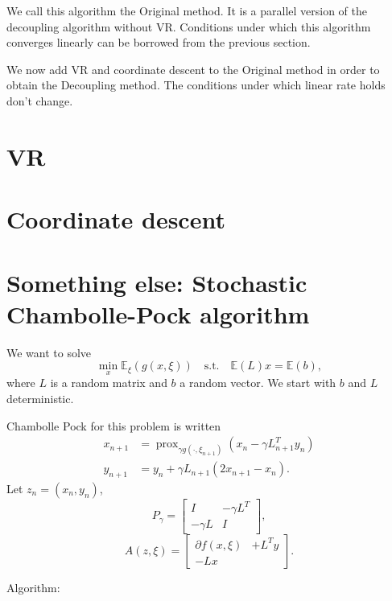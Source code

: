 \documentclass{article}
\DeclareMathOperator{\prox}{prox}
\newcommand{\bE}{{\mathbb E}}
\theoremstyle{definition}
\begin{document}
We call this algorithm the Original method. It is a parallel version of the decoupling algorithm without VR.
Conditions under which this algorithm converges linearly can be borrowed from the previous section.

We now add VR and coordinate descent to the Original method in order to obtain the Decoupling method. The conditions under which linear rate holds don't change.

\section{VR}

\section{Coordinate descent}


\section{Something else: Stochastic Chambolle-Pock algorithm}

We want to solve 
\begin{equation}
    \min_x \bE_\xi(g(x,\xi)) \quad\text{s.t.}\quad \bE(L)x = \bE(b),
\end{equation}
where $L$ is a random matrix and $b$ a random vector. We start with $b$ and $L$ deterministic. 

Chambolle Pock for this problem is written
\begin{align}
    x_{n+1} &= \prox_{\gamma g(\cdot,\xi_{n+1})}(x_n - \gamma L_{n+1}^T y_n)\\
    y_{n+1} &= y_n + \gamma L_{n+1}(2 x_{n+1} - x_n).
\end{align}
Let $z_n = (x_n, y_n)$, 
\[
P_\gamma = \begin{bmatrix} I &  -\gamma L^T \\ -\gamma L & I \end{bmatrix},
\]
\[
A(z,\xi) = \begin{bmatrix} \partial f(x,\xi)&  + L^T y \\ -L x& \end{bmatrix} .
\]

Algorithm:
\end{document}
